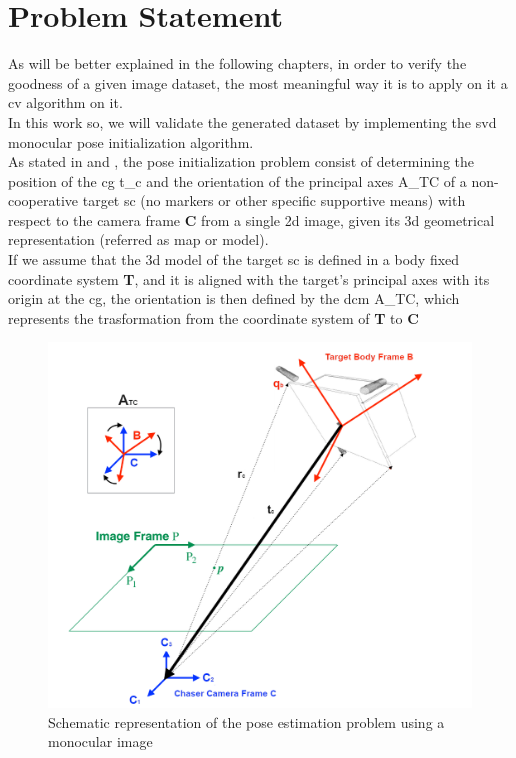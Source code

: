 \section{Problem Statement}
As will be better explained in the following chapters, in order to verify the goodness of a given image dataset, the most meaningful way it is to apply on it a \acrshort{cv} algorithm on it.\\
In this work so, we will validate the generated dataset by implementing the \acrfull{svd} monocular pose initialization algorithm.\\
As stated in \cite{D2014} and \cite{Sharma2018}, the pose initialization problem consist of determining the position of the \acrfull{cg} \gls{t_c} and the orientation of the principal axes \gls{A_TC} of a non-cooperative target \acrshort{sc} (no markers or other specific supportive means) with respect to the camera frame \textbf{C} from a single \acrfull{2d} image, given its \acrfull{3d} geometrical representation (referred as map or model).\\
If we assume that the \acrshort{3d} model of the target \acrshort{sc} is defined in a body fixed coordinate system \textbf{T}, and it is aligned with the target's principal axes with its origin at the \acrshort{cg}, the orientation is then defined by the \acrfull{dcm} \gls{A_TC}, which represents the trasformation from the coordinate system of \textbf{T} to \textbf{C}
\begin{figure}[H]
 	\centering
 	\includegraphics[scale=0.4]{gfx/poseProblem.png}
    \caption{Schematic representation of the pose estimation problem using a monocular image \cite{Sharma2018}}
    \label{fig:gyro}
\end{figure}
